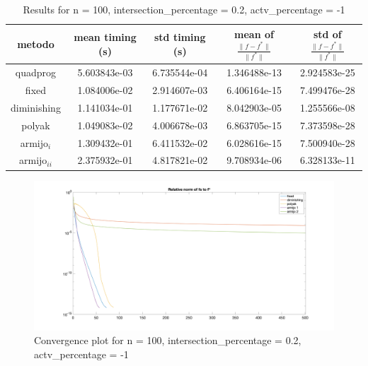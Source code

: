 \captionsetup{justification=centering}



\begin{table}[H]
\setlength{\tabcolsep}{10pt} %
\renewcommand{\arraystretch}{1.2} %
\centering
\begin{tabular}{|ccccc|}
\hline
\multicolumn{1}{|c||}{metodo}   & \multicolumn{1}{c|}{mean timing (s)}    & \multicolumn{1}{c|}{std timing (s)} & \multicolumn{1}{c|}{mean of $\frac{\|f - f^*\|}{\|f^*\|}$}   & std of $\frac{\|f - f^*\|}{\|f^*\|}$ \\ \hline\hline
\multicolumn{1}{|c||}{quadprog} & \multicolumn{1}{c|}{5.603843e-03} & \multicolumn{1}{c|}{6.735544e-04}  & \multicolumn{1}{c|}{1.346488e-13} & 2.924583e-25 \\ \hline\hline
\multicolumn{1}{|c||}{fixed}       & \multicolumn{1}{c|}{1.084006e-02} & \multicolumn{1}{c|}{2.914607e-03}  & \multicolumn{1}{c|}{6.406164e-15} & 7.499476e-28  \\ \hline
\multicolumn{1}{|c||}{diminishing} & \multicolumn{1}{c|}{1.141034e-01} & \multicolumn{1}{c|}{1.177671e-02}  & \multicolumn{1}{c|}{8.042903e-05} & 1.255566e-08 \\ \hline
\multicolumn{1}{|c||}{polyak} & \multicolumn{1}{c|}{1.049083e-02} & \multicolumn{1}{c|}{4.006678e-03}  & \multicolumn{1}{c|}{6.863705e-15} & 7.373598e-28 \\ \hline
\multicolumn{1}{|c||}{armijo$_i$} & \multicolumn{1}{c|}{1.309432e-01} & \multicolumn{1}{c|}{6.411532e-02}  & \multicolumn{1}{c|}{6.028616e-15} & 7.500940e-28 \\ \hline
\multicolumn{1}{|c||}{armijo$_{ii}$} & \multicolumn{1}{c|}{2.375932e-01} & \multicolumn{1}{c|}{4.817821e-02}  & \multicolumn{1}{c|}{9.708934e-06} & 6.328133e-11 \\ \hline
\end{tabular}
\caption{Results for n = 100, intersection\_percentage = 0.2, actv\_percentage = -1}
\label{tab:100_menouno_zerodue}
\end{table}


\begin{figure}[H]
\centering
    \includegraphics[width=20cm, center]{./plots/plot_100_menouno_zerodue.png}
    \caption{Convergence plot for n = 100, intersection\_percentage = 0.2, actv\_percentage = -1}
    \label{fig:100_menouno_zerodue}
\end{figure} 




